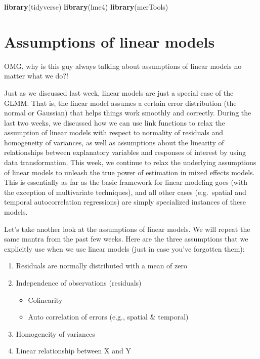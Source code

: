 \documentclass[
]{book}
\newenvironment{Shaded}{\begin{snugshade}}{\end{snugshade}}
\newcommand{\KeywordTok}[1]{\textcolor[rgb]{0.13,0.29,0.53}{\textbf{#1}}}
\newcommand{\NormalTok}[1]{#1}
\providecommand{\tightlist}{%
  \setlength{\itemsep}{0pt}\setlength{\parskip}{0pt}}
\begin{document}
\begin{Shaded}
\begin{Highlighting}[]
\KeywordTok{library}\NormalTok{(tidyverse)}
\KeywordTok{library}\NormalTok{(lme4)}
\KeywordTok{library}\NormalTok{(merTools)}
\end{Highlighting}
\end{Shaded}

\hypertarget{assumptions-lmm}{%
\section{Assumptions of linear models}\label{assumptions-lmm}}

OMG, why is this guy always talking about assumptions of linear models no matter what we do?!

Just as we discussed last week, linear models are just a special case of the GLMM. That is, the linear model assumes a certain error distribution (the normal or Gaussian) that helps things work smoothly and correctly. During the last two weeks, we discussed how we can use link functions to relax the assumption of linear models with respect to normality of residuals and homogeneity of variances, as well as assumptions about the linearity of relationships between explanatory variables and responses of interest by using data transformation. This week, we continue to relax the underlying assumptions of linear models to unleash the true power of estimation in mixed effects models. This is essentially as far as the basic framework for linear modeling goes (with the exception of multivariate techniques), and all other cases (e.g.~spatial and temporal autocorrelation regressions) are simply specialized instances of these models.

Let's take another look at the assumptions of linear models. We will repeat the same mantra from the past few weeks. Here are the three assumptions that we explicitly use when we use linear models (just in case you've forgotten them):

\begin{enumerate}
\def\labelenumi{\arabic{enumi}.}
\item
  Residuals are normally distributed with a mean of zero
\item
  Independence of observations (residuals)

  \begin{itemize}
  \tightlist
  \item
    Colinearity
  \item
    Auto correlation of errors (e.g., spatial \& temporal)
  \end{itemize}
\item
  Homogeneity of variances
\item
  Linear relationship between X and Y
\end{enumerate}
\end{document}
